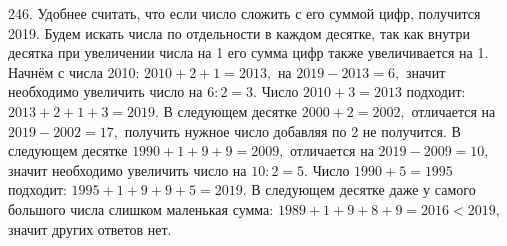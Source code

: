 246. Удобнее считать, что если число сложить с его суммой цифр, получится 2019. Будем искать числа по отдельности в каждом десятке, так как внутри десятка при увеличении числа на 1 его сумма цифр также увеличивается на 1. Начнём с числа 2010: $2010+2+1=2013,$ на $2019-2013=6,$ значит необходимо увеличить число на $6:2=3.$ Число $2010+3=2013$ подходит: $2013+2+1+3=2019.$ В следующем десятке $2000+2=2002,$ отличается на $2019-2002=17,$ получить нужное число добавляя по 2 не получится. В следующем десятке $1990+1+9+9=2009,$ отличается на $2019-2009=10,$ значит необходимо увеличить число на $10:2=5.$ Число $1990+5=1995$ подходит: $1995+1+9+9+5=2019.$ В следующем десятке даже у самого большого числа слишком маленькая сумма: $1989+1+9+8+9=2016<2019,$ значит других ответов нет.\\
